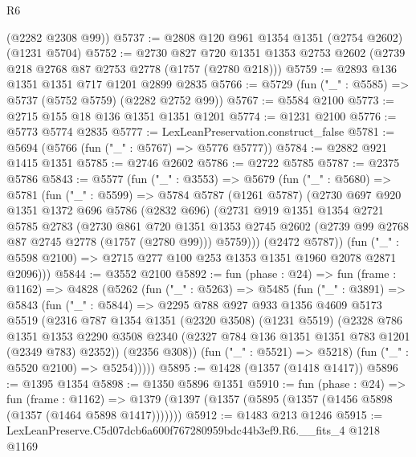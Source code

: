 \begin{lexlean}{R6}
\begin{coremodule}
      (@2282 @2308 @99))
@5737 := @2808 @120 @961 @1354 @1351 (@2754 @2602) (@1231 @5704)
@5752 := @2730
    @827
    @720
    @1351
    @1353
    @2753
    @2602
    (@2739 @218 @2768 @87 @2753 @2778 (@1757 (@2780 @218)))
@5759 := @2893 @136 @1351 @1351 @717 @1201 @2899 @2835
@5766 := @5729 (fun ("_" : @5585) => @5737 (@5752 @5759) (@2282 @2752 @99))
@5767 := @5584 @2100
@5773 := @2715 @155 @18 @136 @1351 @1351 @1201
@5774 := @1231 @2100
@5776 := @5773 @5774 @2835
@5777 := LexLeanPreservation.construct_false
@5781 := @5694 (@5766 (fun ("_" : @5767) => @5776 @5777))
@5784 := @2882 @921 @1415 @1351
@5785 := @2746 @2602
@5786 := @2722 @5785
@5787 := @2375 @5786
@5843 := @5577
    (fun ("_" : @3553) =>
    @5679
      (fun ("_" : @5680) =>
      @5781
        (fun ("_" : @5599) =>
        @5784
          @5787
          (@1261 @5787)
          (@2730
            @697
            @920
            @1351
            @1372
            @696
            @5786
            (@2832 @696)
            (@2731
              @919
              @1351
              @1354
              @2721
              @5785
              @2783
              (@2730
                @861
                @720
                @1351
                @1353
                @2745
                @2602
                (@2739 @99 @2768 @87 @2745 @2778 (@1757 (@2780 @99)))
                @5759)))
          (@2472 @5787))
        (fun ("_" : @5598 @2100) => @2715 @277 @100 @253 @1353 @1351 @1960 @2078 @2871 @2096)))
@5844 := @3552 @2100
@5892 := fun (phase : @24) =>
  fun (frame : @1162) =>
  @4828
    (@5262
      (fun ("_" : @5263) =>
      @5485
        (fun ("_" : @3891) =>
        @5843
          (fun ("_" : @5844) =>
          @2295
            @788
            @927
            @933
            @1356
            @4609
            @5173
            @5519
            (@2316
              @787
              @1354
              @1351
              (@2320 @3508)
              (@1231 @5519)
              (@2328
                @786
                @1351
                @1353
                @2290
                @3508
                @2340
                (@2327 @784 @136 @1351 @1351 @783 @1201 (@2349 @783) @2352))
              (@2356 @308))
            (fun ("_" : @5521) => @5218)
            (fun ("_" : @5520 @2100) => @5254)))))
@5895 := @1428 (@1357 (@1418 @1417))
@5896 := @1395 @1354
@5898 := @1350 @5896 @1351
@5910 := fun (phase : @24) =>
  fun (frame : @1162) =>
  @1379 (@1397 (@1357 (@5895 (@1357 (@1456 @5898 (@1357 (@1464 @5898 @1417)))))))
@5912 := @1483 @213 @1246
@5915 := LexLeanPreserve.C5d07dcb6a600f767280959bdc44b3ef9.R6.__fits_4 @1218 @1169

\end{coremodule}
\end{lexlean}
